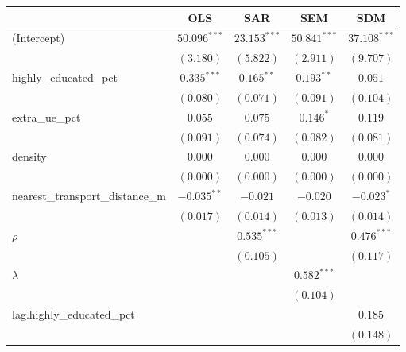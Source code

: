 
\begin{table}
\begin{center}
\begin{tabular}{l c c c c}
\hline
 & OLS & SAR & SEM & SDM \\
\hline
(Intercept)                         & $50.096^{***}$ & $23.153^{***}$ & $50.841^{***}$ & $37.108^{***}$ \\
                                    & $(3.180)$      & $(5.822)$      & $(2.911)$      & $(9.707)$      \\
highly\_educated\_pct               & $0.335^{***}$  & $0.165^{**}$   & $0.193^{**}$   & $0.051$        \\
                                    & $(0.080)$      & $(0.071)$      & $(0.091)$      & $(0.104)$      \\
extra\_ue\_pct                      & $0.055$        & $0.075$        & $0.146^{*}$    & $0.119$        \\
                                    & $(0.091)$      & $(0.074)$      & $(0.082)$      & $(0.081)$      \\
density                             & $0.000$        & $0.000$        & $0.000$        & $0.000$        \\
                                    & $(0.000)$      & $(0.000)$      & $(0.000)$      & $(0.000)$      \\
nearest\_transport\_distance\_m     & $-0.035^{**}$  & $-0.021$       & $-0.020$       & $-0.023^{*}$   \\
                                    & $(0.017)$      & $(0.014)$      & $(0.013)$      & $(0.014)$      \\
$\rho$                              &                & $0.535^{***}$  &                & $0.476^{***}$  \\
                                    &                & $(0.105)$      &                & $(0.117)$      \\
$\lambda$                           &                &                & $0.582^{***}$  &                \\
                                    &                &                & $(0.104)$      &                \\
lag.highly\_educated\_pct           &                &                &                & $0.185$        \\
                                    &                &                &                & $(0.148)$      \\

\end{tabular}
\end{center}
\end{table}
